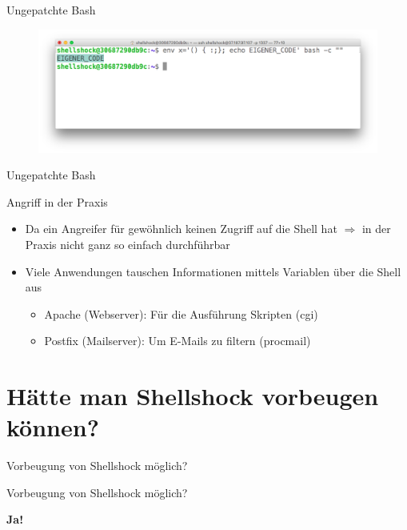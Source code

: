 \documentclass[handout]{beamer}
\begin{document}
\begin{frame}{Ungepatchte Bash}
\begin{figure}
  \centering
    \includegraphics[width=1\textwidth]{assets/example2}
\end{figure}
\end{frame}

\begin{frame}{Ungepatchte Bash}
  \begin{block}{Angriff in der Praxis}
    \begin{itemize}[<+->]
      \item Da ein Angreifer für gewöhnlich keinen Zugriff auf die Shell hat $\Rightarrow$ in der Praxis nicht ganz so einfach durchführbar
      \item Viele Anwendungen tauschen Informationen mittels Variablen über die Shell aus
      \begin{itemize}[<+->]
        \item Apache (Webserver): Für die Ausführung Skripten (cgi)
        \item Postfix (Mailserver): Um E-Mails zu filtern (procmail)
      \end{itemize}
    \end{itemize}
  \end{block}
\end{frame}


\section[Vorbeugung Shellshock?]{Hätte man Shellshock vorbeugen können?}
\begin{frame}{Vorbeugung von Shellshock möglich?}
\begin{center}
\begin{Huge}
\end{Huge}
\end{center}
\end{frame}

\begin{frame}{Vorbeugung von Shellshock möglich?}
\begin{center}
\begin{Huge}
\textbf{Ja!}
\end{Huge}
\end{center}
\end{frame}
\end{document}
